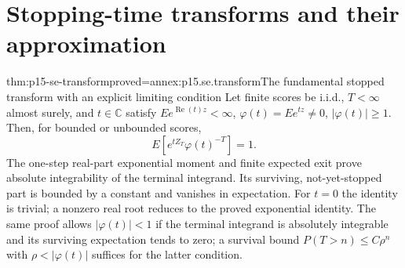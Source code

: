 \section{Stopping-time transforms and their approximation}
\label{sec:p15-se-time-transforms}

\begin{hbtheorem}{thm:p15-se-transform}{proved=annex:p15.se.transform}{The fundamental stopped transform with an explicit limiting condition}
Let finite scores be i.i.d., \(T<\infty\) almost surely, and
\(t\in\mathbb C\) satisfy \(Ee^{\operatorname{Re}(t)z}<\infty\),
\(\varphi(t)=Ee^{tz}\ne0\), \(|\varphi(t)|\geq1\).
Then, for bounded or unbounded scores,
\[
 E\left[e^{tZ_T}\varphi(t)^{-T}\right]=1.
\]
The one-step real-part exponential moment and finite expected exit
prove absolute integrability of the terminal integrand. Its surviving,
not-yet-stopped part is bounded by a constant and vanishes in expectation.
For \(t=0\) the identity is trivial; a nonzero real root reduces to
the proved exponential identity.
The same proof allows \(|\varphi(t)|<1\) if the terminal integrand
is absolutely integrable and its surviving expectation tends to zero;
a survival bound \(P(T>n)\leq C\rho^n\) with
\(\rho<|\varphi(t)|\) suffices for the latter condition.
\cite[Section 4.4, equation (4.35)]{Wald1945SequentialTests}
\end{hbtheorem}

